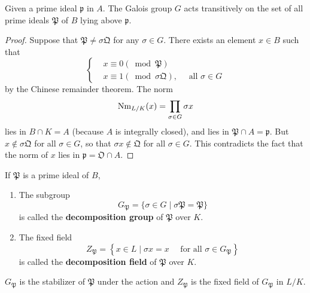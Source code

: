 \documentclass[12pt, oneside]{book}
\begin{document}
\begin{proposition}
    Given a prime ideal $\mathfrak{p}$ in $A$.
    The Galois group $G$ acts transitively on the set of all prime ideals $\mathfrak{P}$ of $B$ lying above $\mathfrak{p}$.
    \begin{proof}
        Suppose that $\mathfrak{P} \neq \sigma \mathfrak{Q}$ for any $\sigma \in G$. There exists an element $x \in B$ such that
        \begin{equation*}
            \begin{cases}
                 & x \equiv 0(\bmod \mathfrak{P})                                          \\
                 & x \equiv 1(\bmod \sigma \mathfrak{Q}), \quad \text { all } \sigma \in G
            \end{cases}
        \end{equation*}
        by the Chinese remainder theorem.
        The norm
        \begin{equation*}
            \operatorname{Nm}_{L/K}(x)=\prod_{\sigma \in G} \sigma x
        \end{equation*}
        lies in $B \cap K=A$ (because $A$ is integrally closed), and lies in $\mathfrak{P} \cap A=\mathfrak{p}$.
        But $x \notin \sigma \mathfrak{Q}$ for all $\sigma \in G$, so that $\sigma x \notin \mathfrak{Q}$ for all $\sigma \in G$. This contradicts the fact that the norm of $x$ lies in $\mathfrak{p}=\mathfrak{O} \cap A$.
    \end{proof}
\end{proposition}

\begin{definition}
    If $\mathfrak{P}$ is a prime ideal of $B$,
    \begin{enumerate}
        \item
              The subgroup
              \begin{equation*}
                  G_{\mathfrak{P}}=\{\sigma \in G \mid \sigma \mathfrak{P}=\mathfrak{P}\}
              \end{equation*}
              is called the \textbf{decomposition group} of $\mathfrak{P}$ over $K$.
        \item
              The fixed field
              \begin{equation*}
                  Z_{\mathfrak{P}}=\left\{x \in L \mid \sigma x=x \quad \text { for all } \sigma \in G_{\mathfrak{P}}\right\}
              \end{equation*}
              is called the \textbf{decomposition field} of $\mathfrak{P}$ over $K$.
    \end{enumerate}
    \begin{remark}
        $G_{\mathfrak{P}}$ is the stabilizer of $\mathfrak{P}$ under the action and $Z_{\mathfrak{P}}$ is the fixed field of $G_{\mathfrak{P}}$ in $L/K$.
    \end{remark}
\end{definition}
\end{document}
